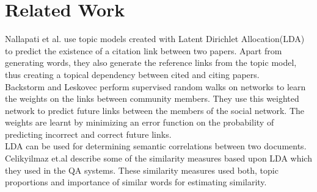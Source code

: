 \documentclass{article} %
\begin{document}
\section{Related Work}
Nallapati et al. \cite{nallapati2008joint} use topic models created with Latent Dirichlet Allocation(LDA) \cite{Blei2003} to predict the existence of a citation link between two papers. Apart from generating words, they also generate the reference links from the topic model, thus creating a topical dependency between cited and citing papers. \\
Backstorm and Leskovec \cite{Backstrom:2011:SRW:1935826.1935914} perform supervised random walks on networks to learn the weights on the links between community members. They use this weighted network to predict future links between the members of the social network. The weights are learnt by minimizing an error function on the probability of predicting incorrect and correct future links. \\
LDA can be used for determining semantic correlations between two documents. Celikyilmaz et.al describe some of the similarity measures based upon LDA which they used in the QA systems. These similarity measures used both, topic proportions and importance of similar words for estimating similarity.
\end{document}

